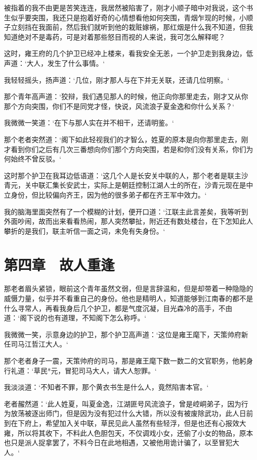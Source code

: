 被指着的我不由更是苦笑连连，我居然被陷害了，刚才小顺子暗中对我说，这个书生似乎要突围，我还只是抱着好奇的心情想看他如何突围，青烟乍现的时候，小顺子立刻挡在我面前，然后我们就听到他的栽赃嫁祸，那红烟是什么我不知道，但我知道绝对不是毒药，可是对着那些怒目而视的人来说，我可怎么解释呢？

这时，雍王府的几个护卫已经冲上楼来，看我安全无恙，一个护卫走到我身边，低声道：‘大人，发生了什么事情。‘

我轻轻摇头，扬声道：‘几位，刚才那人与在下并无关联，还请几位明察。‘

那个青年高声道：‘狡辩，我们遇见那人的时候，他正向你那里走去，刚才又从你那个方向突围，你们不是同党才怪，快说，风流浪子夏金逸和你什么关系？‘

我微微一笑道：‘在下与那人实在并不相干，还请明鉴。‘

那个老者突然道：‘阁下如此轻视我们的才智么，姓夏的原本是向你那里走去，刚才看到你们之后有几次三番想向你们那个方向突围，若是和你们没有关系，你们为何始终不曾反驳。‘

这时那个护卫在我耳边低语道：‘这几个人是长安关中联的人，那个老者是联主沙青元，关中联汇集长安武士，实际上是朝廷控制江湖人士的所在，沙青元现在是中立身份，但比较偏向齐王，因为他的很多弟子都在齐王军中效力。‘

我的脑海里面突然有了一个模糊的计划，便开口道：‘江联主此言差矣，我等听到外面吵闹，故而出来看看热闹，那人突然攀扯，附近还有数处楼台，在下怎知此人攀折的是我们，联主听信一面之词，未免有失身份。‘

\chapter{第四章　故人重逢}

那老者眉头紧锁，眼前这个青年虽然文弱，但是言辞温和，但是却带着一种隐隐的威慑力量，似乎并不看重自己的身份。他也是精明人，知道能够到江南春的都不是什么寻常人，再看我身后几个护卫，都是气度沉凝，目光森冷的高手，不由道：‘阁下说的也有道理，不知阁下怎么称呼。‘

我微微一笑，示意身边的护卫，那个护卫高声道：‘这位是雍王麾下，天策帅府新任司马江哲江大人。‘

那个老者身子一震，天策帅府的司马，那是雍王麾下数一数二的文官职务，他躬身行礼道：‘草民*元，冒犯司马大人，请大人恕罪。‘

我淡淡道：‘不知者不罪，那个黄衣书生是什么人，竟然陷害本官。‘

老者赧然道：‘此人姓夏，叫夏金逸，江湖匪号风流浪子，曾是崆峒弟子，因为行为放荡被逐出师门，但是因为没有犯过什么大错，所以没有被废除武功，此人日前到在下府上，希望加入关中联，草民见此人虽然有些轻浮，但是也还有心报效大雍，所以将其收下，不料此人色胆包天，不仅调戏小女，还偷了小女的物品，原本也只是派人捉拿罢了，不料今日在此地相遇，又被他用诡计骗了，以至冒犯大人。‘

